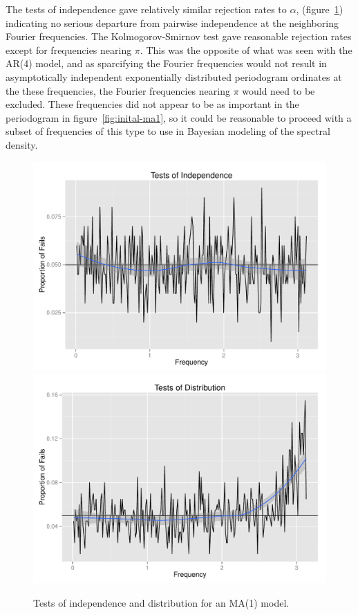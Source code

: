 \documentclass{article}\usepackage{graphicx, color}
\newenvironment{knitrout}{}{} %
\theoremstyle{plain}
\begin{document}
The tests of independence gave relatively similar rejection rates to $\alpha$, (figure~\ref{fig:tests-ma1}) indicating no serious departure from pairwise independence at the neighboring Fourier frequencies. The Kolmogorov-Smirnov test gave reasonable rejection rates except for frequencies nearing $\pi$. This was the opposite of what was seen with the AR(4) model, and as sparcifying the Fourier frequencies would not result in asymptotically independent exponentially distributed periodogram ordinates at the these frequencies, the Fourier frequencies nearing $\pi$ would need to be excluded. These frequencies did not appear to be as important in the periodogram in figure~\ref{fig:inital-ma1}, so it could be reasonable to proceed with a subset of frequencies of this type to use in Bayesian modeling of the spectral density. 

\begin{knitrout}
\color{fgcolor}\begin{figure}[h]

\includegraphics[width=.49\textwidth]{figure/tests-ma11} 
\includegraphics[width=.49\textwidth]{figure/tests-ma12} \caption[Tests of independence and distribution for an MA(1) model]{Tests of independence and distribution for an MA(1) model.\label{fig:tests-ma1}}
\end{figure}


\end{knitrout}


% 
% 
\end{document}
